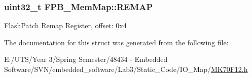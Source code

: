 \subsubsection[{R\+E\+M\+A\+P}]{\setlength{\rightskip}{0pt plus 5cm}uint32\+\_\+t F\+P\+B\+\_\+\+Mem\+Map\+::\+R\+E\+M\+A\+P}\label{struct_f_p_b___mem_map_acdaa312f2de037db4f203b9cfd303772}
Flash\+Patch Remap Register, offset\+: 0x4 

The documentation for this struct was generated from the following file\+:\begin{DoxyCompactItemize}
\item 
E\+:/\+U\+T\+S/\+Year 3/\+Spring Semester/48434 -\/ Embedded Software/\+S\+V\+N/embedded\+\_\+software/\+Lab3/\+Static\+\_\+\+Code/\+I\+O\+\_\+\+Map/\hyperlink{_m_k70_f12_8h}{M\+K70\+F12.\+h}\end{DoxyCompactItemize}
